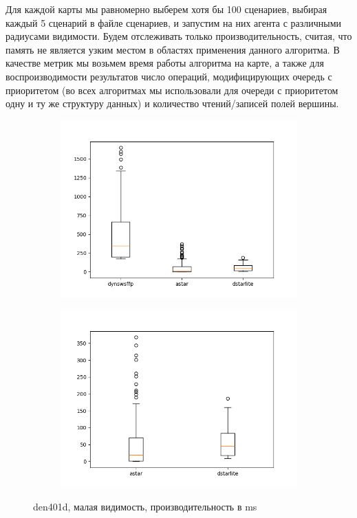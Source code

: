 \documentclass[11pt]{article}
\begin{document}
    Для каждой карты мы равномерно выберем хотя бы 100 сценариев, выбирая каждый 5 сценарий в файле сценариев, и запустим на них агента с различными радиусами видимости.
    Будем отслеживать только производительность, считая, что память не является узким местом в областях применения данного алгоритма.
    В качестве метрик мы возьмем время работы алгоритма на карте, а также для воспроизводимости результатов число операций, модифицирующих очередь с приоритетом (во всех алгоритмах мы использовали для очереди с приоритетом одну и ту же структуру данных) и количество чтений/записей полей вершины.

    \begin{figure}
        \centering
        \begin{subfigure}[b]{0.48\textwidth}
            \centering
            \includegraphics[width=\textwidth]{../plots/r5/den401d-('dynswsffp', 'astar', 'dstarlite').png}
        \end{subfigure}
        \hfill
        \begin{subfigure}[b]{0.48\textwidth}
            \centering
            \includegraphics[width=\textwidth]{../plots/r5/den401d-('astar', 'dstarlite').png}
        \end{subfigure}
        \caption{den401d, малая видимость, производительность в ms}
        \label{fig: den401d-r5}
    \end{figure}
\end{document}
